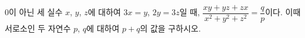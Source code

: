 \hspace*{2mm}\begin{minipage}[t]{\dimexpr\linewidth-2mm\relax}\vspace{0pt}
$0$이 아닌 세 실수 $x$, $y$, $z$에 대하여 $3x=y$, $2y=3z$일 때, $\dfrac{xy+yz+zx}{x^2+y^2+z^2}=\dfrac{q}{p}$이다. 이때 서로소인 두 자연수 $p$, $q$에 대하여 $p+q$의 값을 구하시오.\end{minipage}
